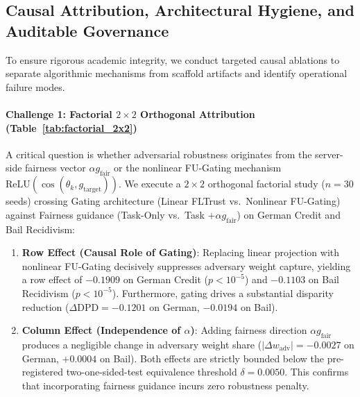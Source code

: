 \subsection{Causal Attribution, Architectural Hygiene, and Auditable Governance}
\label{subsec:attribution}

To ensure rigorous academic integrity, we conduct targeted causal ablations to separate algorithmic mechanisms from scaffold artifacts and identify operational failure modes.




\paragraph{Challenge 1: Factorial $2 \times 2$ Orthogonal Attribution (Table~\ref{tab:factorial_2x2})}
A critical question is whether adversarial robustness originates from the server-side fairness vector $\alpha g_{\text{fair}}$ or the nonlinear FU-Gating mechanism $\text{ReLU}(\cos(\theta_k, g_{\text{target}}))$. We execute a $2 \times 2$ orthogonal factorial study ($n=30$ seeds) crossing Gating architecture (Linear FLTrust vs.\ Nonlinear FU-Gating) against Fairness guidance (Task-Only vs.\ Task $+ \alpha g_{\text{fair}}$) on German Credit and Bail Recidivism:
\begin{enumerate}[leftmargin=*]
    \item \textbf{Row Effect (Causal Role of Gating)}: Replacing linear projection with nonlinear FU-Gating decisively suppresses adversary weight capture, yielding a row effect of $-0.1909$ on German Credit ($p < 10^{-5}$) and $-0.1103$ on Bail Recidivism ($p < 10^{-5}$). Furthermore, gating drives a substantial disparity reduction ($\Delta \text{DPD} = -0.1201$ on German, $-0.0194$ on Bail).
    \item \textbf{Column Effect (Independence of $\alpha$)}: Adding fairness direction $\alpha g_{\text{fair}}$ produces a negligible change in adversary weight share ($|\Delta w_{\mathrm{adv}}| = -0.0027$ on German, $+0.0004$ on Bail). Both effects are strictly bounded below the pre-registered two-one-sided-test equivalence threshold $\delta = 0.0050$. This confirms that incorporating fairness guidance incurs zero robustness penalty.
\end{enumerate}

